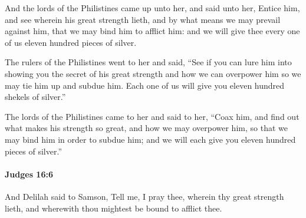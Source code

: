 			\begin{versebox}
					\item[BHS] 
					\item[ASV] And the lords of the Philistines came up unto her, and said unto her, Entice him, and see wherein his great strength lieth, and by what means we may prevail against him, that we may bind him to afflict him: and we will give thee every one of us eleven hundred pieces of silver.
					\item[NIV] The rulers of the Philistines went to her and said, “See if you can lure him into showing you the secret of his great strength and how we can overpower him so we may tie him up and subdue him. Each one of us will give you eleven hundred shekels of silver.”
					\item[NRSV] The lords of the Philistines came to her and said to her, “Coax him, and find out what makes his strength so great, and how we may overpower him, so that we may bind him in order to subdue him; and we will each give you eleven hundred pieces of silver.”
			\end{versebox}

		\paragraph{Judges 16:6} %
			\label{JUDGES-16-6}

			And Delilah said to Samson, Tell me, I pray thee, wherein thy great strength lieth, and wherewith thou mightest be bound to afflict thee.

